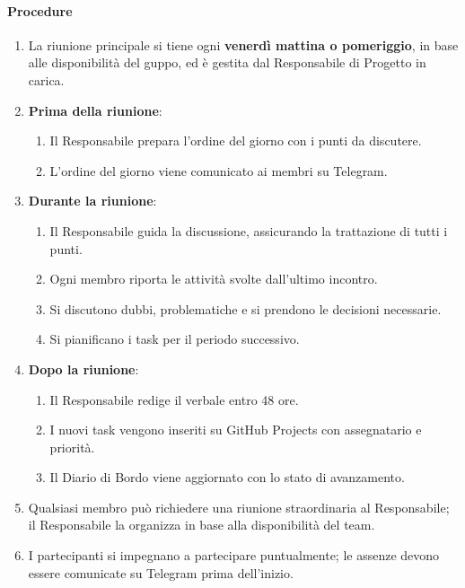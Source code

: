 \documentclass[a4paper, 11pt, oneside]{scrartcl}
\begin{document}
\paragraph{Procedure}
\begin{enumerate}
    \item La riunione principale si tiene ogni \textbf{venerdì mattina o pomeriggio}, in base alle disponibilità del guppo, ed è gestita dal Responsabile di Progetto in carica.
    \item \textbf{Prima della riunione}:
          \begin{enumerate}[label=\alph*.]
              \item Il Responsabile prepara l'ordine del giorno con i punti da discutere.
              \item L'ordine del giorno viene comunicato ai membri su Telegram.
          \end{enumerate}
    \item \textbf{Durante la riunione}:
          \begin{enumerate}[label=\alph*.]
              \item Il Responsabile guida la discussione, assicurando la trattazione di tutti i punti.
              \item Ogni membro riporta le attività svolte dall'ultimo incontro.
              \item Si discutono dubbi, problematiche e si prendono le decisioni necessarie.
              \item Si pianificano i task per il periodo successivo.
          \end{enumerate}
    \item \textbf{Dopo la riunione}:
          \begin{enumerate}[label=\alph*.]
              \item Il Responsabile redige il verbale entro 48 ore.
              \item I nuovi task vengono inseriti su GitHub Projects con assegnatario e priorità.
              \item Il Diario di Bordo viene aggiornato con lo stato di avanzamento.
          \end{enumerate}
    \item Qualsiasi membro può richiedere una riunione straordinaria al Responsabile; il Responsabile la organizza in base alla disponibilità del team.
    \item I partecipanti si impegnano a partecipare puntualmente; le assenze devono essere comunicate su Telegram prima dell'inizio.
\end{enumerate}
\end{document}
